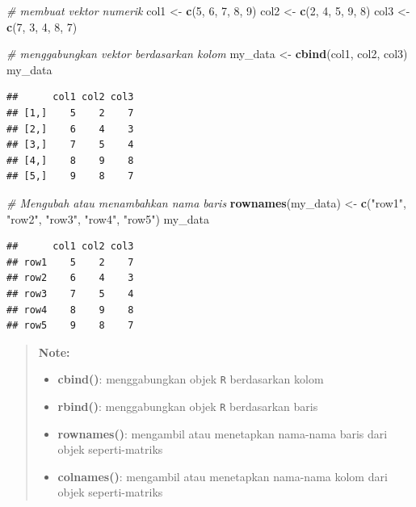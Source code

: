\documentclass[]{book}
\newenvironment{Shaded}{\begin{snugshade}}{\end{snugshade}}
\newcommand{\KeywordTok}[1]{\textcolor[rgb]{0.13,0.29,0.53}{\textbf{#1}}}
\newcommand{\DecValTok}[1]{\textcolor[rgb]{0.00,0.00,0.81}{#1}}
\newcommand{\StringTok}[1]{\textcolor[rgb]{0.31,0.60,0.02}{#1}}
\newcommand{\CommentTok}[1]{\textcolor[rgb]{0.56,0.35,0.01}{\textit{#1}}}
\newcommand{\NormalTok}[1]{#1}
\providecommand{\tightlist}{%
  \setlength{\itemsep}{0pt}\setlength{\parskip}{0pt}}
\begin{document}
\begin{Shaded}
\begin{Highlighting}[]
\CommentTok{# membuat vektor numerik}
\NormalTok{col1 <-}\StringTok{ }\KeywordTok{c}\NormalTok{(}\DecValTok{5}\NormalTok{, }\DecValTok{6}\NormalTok{, }\DecValTok{7}\NormalTok{, }\DecValTok{8}\NormalTok{, }\DecValTok{9}\NormalTok{)}
\NormalTok{col2 <-}\StringTok{ }\KeywordTok{c}\NormalTok{(}\DecValTok{2}\NormalTok{, }\DecValTok{4}\NormalTok{, }\DecValTok{5}\NormalTok{, }\DecValTok{9}\NormalTok{, }\DecValTok{8}\NormalTok{)}
\NormalTok{col3 <-}\StringTok{ }\KeywordTok{c}\NormalTok{(}\DecValTok{7}\NormalTok{, }\DecValTok{3}\NormalTok{, }\DecValTok{4}\NormalTok{, }\DecValTok{8}\NormalTok{, }\DecValTok{7}\NormalTok{)}

\CommentTok{# menggabungkan vektor berdasarkan kolom}
\NormalTok{my_data <-}\StringTok{ }\KeywordTok{cbind}\NormalTok{(col1, col2, col3)}
\NormalTok{my_data}
\end{Highlighting}
\end{Shaded}

\begin{verbatim}
##      col1 col2 col3
## [1,]    5    2    7
## [2,]    6    4    3
## [3,]    7    5    4
## [4,]    8    9    8
## [5,]    9    8    7
\end{verbatim}

\begin{Shaded}
\begin{Highlighting}[]
\CommentTok{# Mengubah atau menambahkan nama baris}
\KeywordTok{rownames}\NormalTok{(my_data) <-}\StringTok{ }\KeywordTok{c}\NormalTok{(}\StringTok{"row1"}\NormalTok{, }\StringTok{"row2"}\NormalTok{, }\StringTok{"row3"}\NormalTok{, }\StringTok{"row4"}\NormalTok{, }\StringTok{"row5"}\NormalTok{)}
\NormalTok{my_data}
\end{Highlighting}
\end{Shaded}

\begin{verbatim}
##      col1 col2 col3
## row1    5    2    7
## row2    6    4    3
## row3    7    5    4
## row4    8    9    8
## row5    9    8    7
\end{verbatim}

\begin{quote}
\textbf{Note: }

\begin{itemize}
\tightlist
\item
  \textbf{cbind()}: menggabungkan objek \texttt{R} berdasarkan kolom
\item
  \textbf{rbind()}: menggabungkan objek \texttt{R} berdasarkan baris
\item
  \textbf{rownames()}: mengambil atau menetapkan nama-nama baris dari
  objek seperti-matriks
\item
  \textbf{colnames()}: mengambil atau menetapkan nama-nama kolom dari
  objek seperti-matriks
\end{itemize}
\end{quote}
\end{document}
